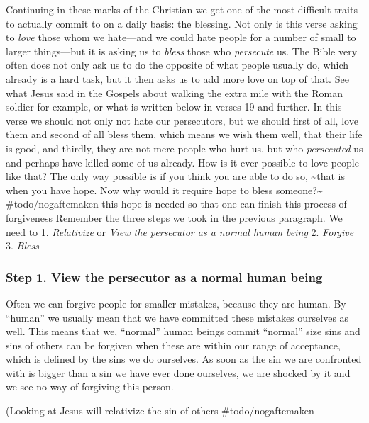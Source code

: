 Continuing in these marks of the Christian we get one of the most
difficult traits to actually commit to on a daily basis: the blessing.
Not only is this verse asking to \emph{love} those whom we hate---and we
could hate people for a number of small to larger things---but it is
asking us to \emph{bless} those who \emph{persecute} us. The Bible very
often does not only ask us to do the opposite of what people usually do,
which already is a hard task, but it then asks us to add more love on
top of that. See what Jesus said in the Gospels about walking the extra
mile with the Roman soldier for example, or what is written below in
verses 19 and further. In this verse we should not only not hate our
persecutors, but we should first of all, love them and second of all
bless them, which means we wish them well, that their life is good, and
thirdly, they are not mere people who hurt us, but who \emph{persecuted}
us and perhaps have killed some of us already. How is it ever possible
to love people like that? The only way possible is if you think you are
able to do so, \textasciitilde that is when you have hope. Now why would
it require hope to bless someone?\textasciitilde{} \#todo/nogaftemaken
this hope is needed so that one can finish this process of forgiveness
Remember the three steps we took in the previous paragraph. We need to
1. \emph{Relativize} or \emph{View the persecutor as a normal human
being} 2. \emph{Forgive} 3. \emph{Bless}

\subsubsection{Step 1. View the persecutor as a normal human being} Often we
can forgive people for smaller mistakes, because they are human. By
``human'' we usually mean that we have committed these mistakes
ourselves as well. This means that we, ``normal'' human beings commit
``normal'' size sins and sins of others can be forgiven when these are
within our range of acceptance, which is defined by the sins we do
ourselves. As soon as the sin we are confronted with is bigger than a
sin we have ever done ourselves, we are shocked by it and we see no way
of forgiving this person.

(Looking at Jesus will relativize the sin of others \#todo/nogaftemaken

